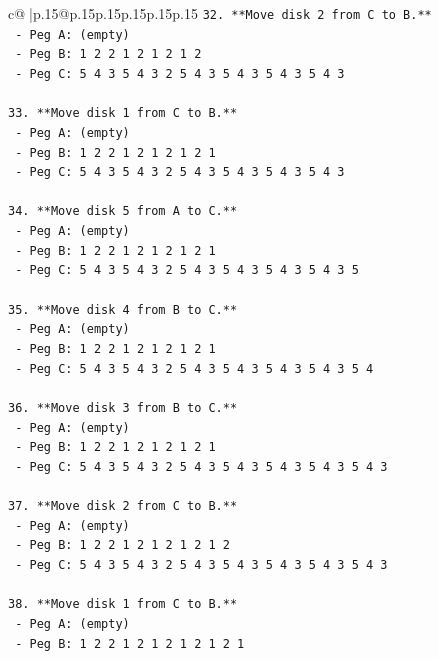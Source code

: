 \documentclass{article}
\begin{document}
{\begin{supertabular}{c@{$\;$}|p{.15\linewidth}@{}p{.15\linewidth}p{.15\linewidth}p{.15\linewidth}p{.15\linewidth}p{.15\linewidth}}
{{{\texttt{32. **Move disk 2 from C to B.**} \\
\texttt{    {-} Peg A: (empty)} \\
\texttt{    {-} Peg B: 1 2 2 1 2 1 2 1 2} \\
\texttt{    {-} Peg C: 5 4 3 5 4 3 2 5 4 3 5 4 3 5 4 3 5 4 3} \\
\\ 
\texttt{33. **Move disk 1 from C to B.**} \\
\texttt{    {-} Peg A: (empty)} \\
\texttt{    {-} Peg B: 1 2 2 1 2 1 2 1 2 1} \\
\texttt{    {-} Peg C: 5 4 3 5 4 3 2 5 4 3 5 4 3 5 4 3 5 4 3} \\
\\ 
\texttt{34. **Move disk 5 from A to C.**} \\
\texttt{    {-} Peg A: (empty)} \\
\texttt{    {-} Peg B: 1 2 2 1 2 1 2 1 2 1} \\
\texttt{    {-} Peg C: 5 4 3 5 4 3 2 5 4 3 5 4 3 5 4 3 5 4 3 5} \\
\\ 
\texttt{35. **Move disk 4 from B to C.**} \\
\texttt{    {-} Peg A: (empty)} \\
\texttt{    {-} Peg B: 1 2 2 1 2 1 2 1 2 1} \\
\texttt{    {-} Peg C: 5 4 3 5 4 3 2 5 4 3 5 4 3 5 4 3 5 4 3 5 4} \\
\\ 
\texttt{36. **Move disk 3 from B to C.**} \\
\texttt{    {-} Peg A: (empty)} \\
\texttt{    {-} Peg B: 1 2 2 1 2 1 2 1 2 1} \\
\texttt{    {-} Peg C: 5 4 3 5 4 3 2 5 4 3 5 4 3 5 4 3 5 4 3 5 4 3} \\
\\ 
\texttt{37. **Move disk 2 from C to B.**} \\
\texttt{    {-} Peg A: (empty)} \\
\texttt{    {-} Peg B: 1 2 2 1 2 1 2 1 2 1 2} \\
\texttt{    {-} Peg C: 5 4 3 5 4 3 2 5 4 3 5 4 3 5 4 3 5 4 3 5 4 3} \\
\\ 
\texttt{38. **Move disk 1 from C to B.**} \\
\texttt{    {-} Peg A: (empty)} \\
\texttt{    {-} Peg B: 1 2 2 1 2 1 2 1 2 1 2 1} \\
}}}
\end{supertabular}}
\end{document}
